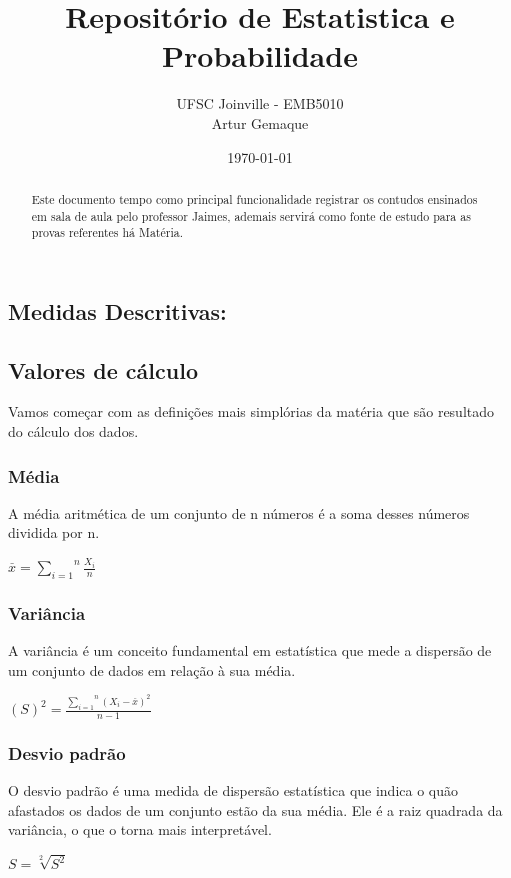 \documentclass{article}
\title{\textbf{Repositório de Estatistica e Probabilidade}}
\author{UFSC Joinville - EMB5010 \\ Artur Gemaque}
\date{\today}
\begin{document}
\maketitle

\begin{abstract}
Este documento tempo como principal funcionalidade registrar os contudos ensinados 
em sala de aula pelo professor Jaimes, ademais servirá como fonte de estudo para as 
provas referentes há Matéria.
\end{abstract}

\begin{multicols}{2} %
\section{ Medidas Descritivas:}

  \subsection{Valores de cálculo}
      Vamos começar com as definições mais simplórias da matéria que são resultado do cálculo dos dados.

      \subsubsection{Média}
      A média aritmética de um conjunto de n números é a soma desses números dividida por n.
        \begin{center}
          $ \overset{\_}{x} =  \overset{n}{\underset{i=1}{\sum}} \frac{X_i}{n}  $
        \end{center}

      \subsubsection{Variância}
      A variância é um conceito fundamental em estatística que mede a dispersão de um conjunto de dados em relação à sua média.
        \begin{center}
          $ (S)^2 =  \frac{\overset{n}{\underset{i=1}{\sum}} (X_i - \overset{\_}{x} )^2 }{n - 1} $
        \end{center}

      \subsubsection{Desvio padrão}
      O desvio padrão é uma medida de dispersão estatística que indica o quão afastados os 
      dados de um conjunto estão da sua média. Ele é a raiz quadrada da variância, o que o 
      torna mais interpretável.
        \begin{center}
          $ S = \sqrt[2]{S^2}$
        \end{center}


\end{multicols}
\end{document}
